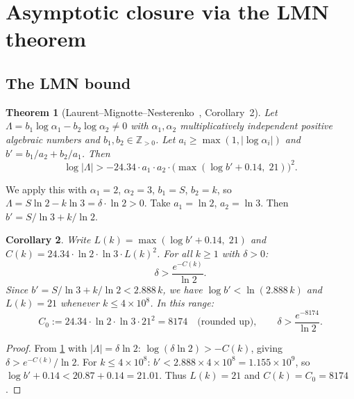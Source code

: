 \documentclass[11pt, a4paper]{amsart}
\theoremstyle{plain}
\newtheorem{theorem}{Theorem}[section]
\newtheorem{corollary}[theorem]{Corollary}
\theoremstyle{definition}
\theoremstyle{remark}
\newcommand{\Z}{\mathbb{Z}}
\begin{document}
\section{Asymptotic closure via the LMN theorem}\label{sec:baker}

\subsection{The LMN bound}\label{ssec:lmn}

\begin{theorem}[Laurent--Mignotte--Nesterenko~\cite{LMN1995},
  Corollary~2]\label{thm:lmn}
  Let $\Lambda = b_1 \log \alpha_1 - b_2 \log \alpha_2 \neq 0$
  with $\alpha_1, \alpha_2$ multiplicatively independent positive
  algebraic numbers and $b_1, b_2 \in \Z_{>0}$.
  Let $a_i \geq \max(1, |\log \alpha_i|)$ and
  $b' = b_1/a_2 + b_2/a_1$.  Then
  \begin{equation}\label{eq:lmn-full}
    \log|\Lambda| > -24.34 \cdot a_1 \cdot a_2
    \cdot \bigl(\max(\log b' + 0.14,\; 21)\bigr)^2.
  \end{equation}
\end{theorem}

We apply this with $\alpha_1 = 2$, $\alpha_2 = 3$,
$b_1 = S$, $b_2 = k$, so
$\Lambda = S \ln 2 - k \ln 3 = \delta \cdot \ln 2 > 0$.
Take $a_1 = \ln 2$, $a_2 = \ln 3$.  Then
$b' = S/\ln 3 + k/\ln 2$.

\begin{corollary}\label{cor:delta-bound}
  Write $L(k) = \max(\log b' + 0.14, \; 21)$ and
  $C(k) = 24.34 \cdot \ln 2 \cdot \ln 3 \cdot L(k)^2$.
  For all $k \geq 1$ with $\delta > 0$:
  \begin{equation}\label{eq:delta-lower}
    \delta > \frac{e^{-C(k)}}{\ln 2}.
  \end{equation}
  Since $b' = S/\ln 3 + k/\ln 2 < 2.888\, k$, we have
  $\log b' < \ln(2.888\,k)$ and
  $L(k) = 21$ whenever $k \leq 4 \times 10^8$.
  In this range:
  \begin{equation}\label{eq:delta-small-k}
    C_0 := 24.34 \cdot \ln 2 \cdot \ln 3 \cdot 21^2
    = 8174 \quad\text{(rounded up)},
    \qquad
    \delta > \frac{e^{-8174}}{\ln 2}.
  \end{equation}
\end{corollary}

\begin{proof}
  From \cref{thm:lmn} with $|\Lambda| = \delta \ln 2$:
  $\log(\delta \ln 2) > -C(k)$, giving
  $\delta > e^{-C(k)} / \ln 2$.
  For $k \leq 4 \times 10^8$:
  $b' < 2.888 \times 4 \times 10^8 = 1.155 \times 10^9$,
  so $\log b' + 0.14 < 20.87 + 0.14 = 21.01$.
  Thus $L(k) = 21$ and $C(k) = C_0 = 8174$.
\end{proof}
\end{document}
